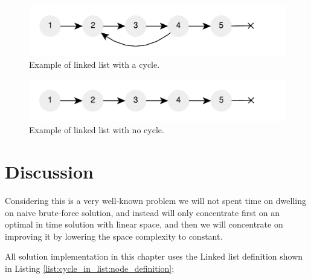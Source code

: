 \begin{figure}
	\centering
	\includegraphics[scale=1.0]{sources/cycle_in_list/images/list_cycle}
	\caption{Example of linked list with a cycle.}
	\label{fig:cycle_in_list:example1}
\end{figure}
\begin{figure}
	\label{fig:cycle_in_list:example2}
	\centering
	\includegraphics[scale=1.0]{sources/cycle_in_list/images/list_no_cycle}
	\caption{Example of linked list with no cycle.}
\end{figure}

%
%

\section{Discussion}
\label{cycle_in_list:sec:discussion}
Considering this is a very well-known problem we will not spent time on dwelling on naive
brute-force solution, and instead will only concentrate first on an optimal in time solution with
linear space, and then we will concentrate on improving it by lowering the space complexity to
constant. 

All solution implementation in this chapter uses the  Linked list definition shown in Listing \ref{list:cycle_in_list:node_definition};

\begin{minipage}{\linewidth}
	
\end{minipage}

